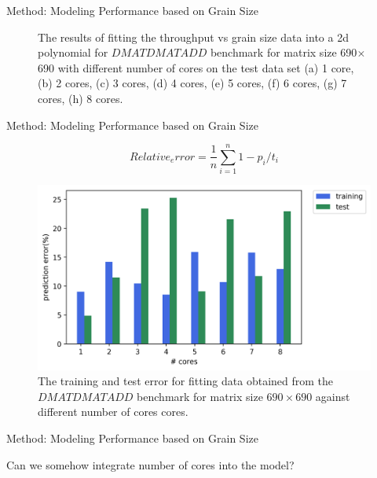 \documentclass[10pt]{beamer}
\begin{document}
\begin{frame}{Method: Modeling Performance based on Grain Size}
\begin{outline}
\begin{figure}[H]
			\caption{The results of fitting the throughput vs grain size data into a 2d polynomial for $DMATDMATADD$ benchmark for matrix size 690$\times$690 with different number of cores on the test data set (a) 1 core, (b) 2 cores, (c) 3 cores, (d) 4 cores, (e) 5 cores, (f) 6 cores, (g) 7 cores, (h) 8 cores.}	
			\label{fig10}
		\end{figure}
	\end{outline}
\end{frame}


\begin{frame}{Method: Modeling Performance based on Grain Size}
	\begin{outline}	
		$$Relative_error = \frac{1}{n}\sum_{i=1}^{n} {1-p_i/t_i}$$
\begin{figure}[H]
	\centering
	\includegraphics[scale=.5]{images/polyfit/fig_train_test_690.png}
	\caption{The training and test error for fitting data obtained from the $DMATDMATADD$ benchmark for matrix size $690\times690$ against different number of cores cores.}	
	\label{fig11}
\end{figure}
	\end{outline}
\end{frame}

\begin{frame}{Method: Modeling Performance based on Grain Size}
	\begin{outline}	
		Can we somehow integrate number of cores into the model?
	\end{outline}
\end{frame}
\end{document}
